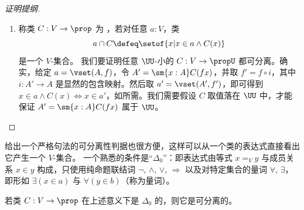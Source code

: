 \begin{proof}[证明提纲]
\begin{enumerate}
  \item 称类 $C: V\to\prop$ 为
    ，若对任意 $a:V$，类
  \begin{equation*}
    a \cap C \defeq\setof{x | x\in a \wedge C(x)}
  \end{equation*}
  是一个 $V$-集合。
我们要证明任意 $\UU$-小的 $C: V \to \propU$ 都可分离。确实，给定 $a=\vset(A,f)$，令 $A' = \sm{x:A}C(fx)$，并取 $f' = f\circ i$，其中 $i : A' \to A$ 是显然的包含映射。然后取 $a' = \vset(A',f')$，即可得到 $x\in a\wedge C(x) \Leftrightarrow x\in a'$，如所需。我们需要假设 $C$ 取值落在 $\UU$ 中，才能保证 $A' = \sm{x:A}C(fx)$ 属于 $\UU$。\qedhere
\end{enumerate}
\end{proof}

给出一个严格句法的可分离性判据也很方便，这样可以从一个类的表达式直接看出它产生一个 $V$-集合。
一个熟悉的条件是“$\Delta_0$”：即表达式由等式 $x=_V y$ 与成员关系 $x\in y$ 构成，只使用纯命题联结词 $\neg$, $\land$, $\lor$, $\Rightarrow$ 以及对特定集合的量词 $\forall$, $\exists$，即形如 $\exists(x\in a)$ 与 $\forall(y\in b)$（称为量词）。%

\begin{cor}\label{cor:Delta0sep}
若类 $C: V \to \prop$ 在上述意义下是 $\Delta_0$ 的，则它是可分离的。
\end{cor}
%

